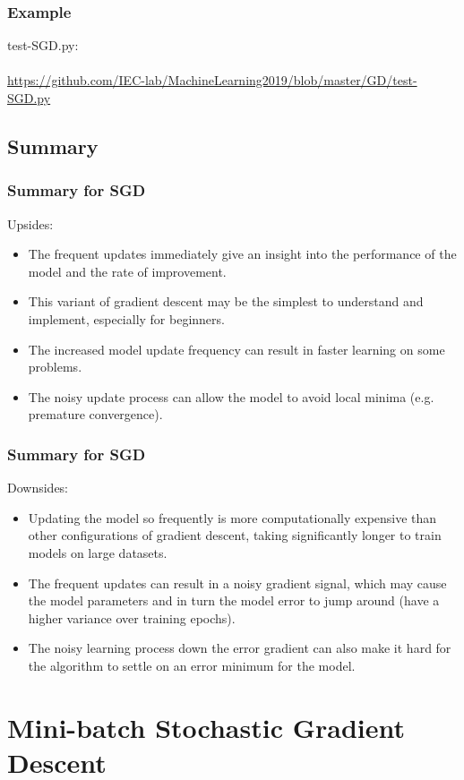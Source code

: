 \documentclass[cjk]{beamer}
\begin{document}
\begin{frame}
\frametitle{Example}
test-SGD.py:\\
~\\
\url{https://github.com/IEC-lab/MachineLearning2019/blob/master/GD/test-SGD.py}
\end{frame}

\subsection{Summary}
\begin{frame}
\frametitle{Summary for SGD}
Upsides:
\begin{itemize}
	\item The frequent updates immediately give an insight into the performance of the model and the rate of improvement.
	\item This variant of gradient descent may be the simplest to understand and implement, especially for beginners.
	\item The increased model update frequency can result in faster learning on some problems.
	\item The noisy update process can allow the model to avoid local minima (e.g. premature convergence).
\end{itemize}
\end{frame}

\begin{frame}
\frametitle{Summary for SGD}
Downsides:
\begin{itemize}
	\item Updating the model so frequently is more computationally expensive than other configurations of gradient descent, taking significantly longer to train models on large datasets.
	\item The frequent updates can result in a noisy gradient signal, which may cause the model parameters and in turn the model error to jump around (have a higher variance over training epochs).
	\item The noisy learning process down the error gradient can also make it hard for the algorithm to settle on an error minimum for the model.
\end{itemize}
\end{frame}

\section{Mini-batch Stochastic Gradient Descent}
\end{document}
